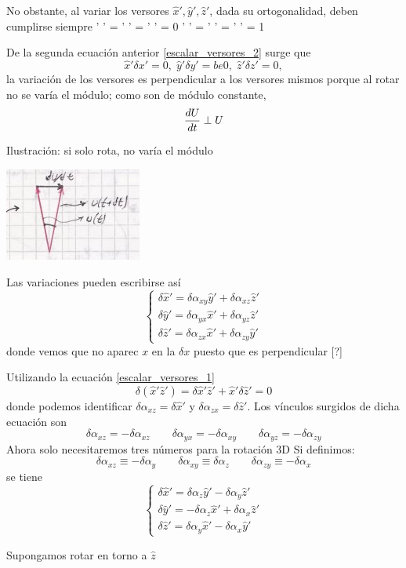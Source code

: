 \documentclass[10pt,oneside]{CBFT_book}
\begin{document}
No obstante, al variar los versores $\hat{x}',\hat{y}',\hat{z}'$, dada su ortogonalidad,
deben cumplirse siempre
\be
	' ' = ' ' = ' ' = 0
	\label{escalar_versores_1}
\ee
\be
	' ' = ' ' = ' ' = 1
	\label{escalar_versores_2}
\ee

De la segunda ecuación anterior \eqref{escalar_versores_2} surge que 
\[
	\hat{x}' \delta {x}' = 0, \; \hat{y}' \delta {y}' = be0, \;  \hat{z}' \delta {z}' = 0,
\]
la variación de los versores es perpendicular a los versores mismos porque al rotar no se varía
el módulo; como son de módulo constante,
\[
	\frac{d^{\hspace{-0.05em}} {U}}{d {t}^{\hspace{-0.05em}}} \perp U
\]

Ilustración: si solo rota, no varía el módulo

\includegraphics[scale=0.5]{images/fig_mc_rotantes4.jpg}

Las variaciones pueden escribirse así
\[
	\begin{cases}
	\delta \hat{x}' = \delta \alpha_{xy} \hat{y}' + \delta \alpha_{xz} \hat{z}' \\
	\delta \hat{y}' = \delta \alpha_{yx} \hat{x}' + \delta \alpha_{yz} \hat{z}' \\
	\delta \hat{z}' = \delta \alpha_{zx} \hat{x}' + \delta \alpha_{zy} \hat{y}'
	\end{cases}
\]
donde vemos que no aparec $x$ en la $\delta x$ puesto que es perpendicular [?]

Utilizando la ecuación \eqref{escalar_versores_1}
\[
	\delta( \hat{x}' \hat{z}') = \delta \hat{x}' \hat{z}' + \hat{x}' \delta \hat{z}' = 0
\]
donde podemos identificar $\delta\alpha_{xz}=\delta \hat{x}'$ y $\delta\alpha_{zx}=\delta \hat{z}'$.
Los vínculos surgidos de dicha ecuación son 
\[
	\delta\alpha_{xz} = -\delta\alpha_{xz} \qquad 
	\delta\alpha_{yx} = -\delta\alpha_{xy} \qquad 
	\delta\alpha_{yz} = -\delta\alpha_{zy} 
\]
Ahora solo necesitaremos tres números para la rotación 3D
Si definimos:
\[
	\delta\alpha_{xz} \equiv -\delta\alpha_{y} \qquad 
	\delta\alpha_{xy} \equiv \delta\alpha_{z} \qquad 
	\delta\alpha_{zy} \equiv -\delta\alpha_{x} 
\]
se tiene 
\[
	\begin{cases}
	\delta \hat{x}' = \delta \alpha_{z} \hat{y}' - \delta \alpha_{y} \hat{z}' \\
	\delta \hat{y}' = -\delta \alpha_{z} \hat{x}' + \delta \alpha_{x} \hat{z}' \\
	\delta \hat{z}' = \delta \alpha_{y} \hat{x}' - \delta \alpha_{x} \hat{y}'
	\end{cases}
\]

Supongamos rotar en torno a $\hat{z}$

\end{document}
